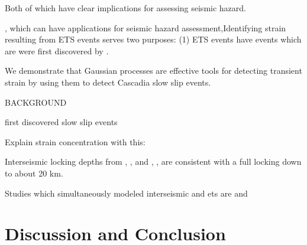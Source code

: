 \documentclass[10pt,a4paper]{article}
\begin{document}
Both of which have clear implications for assessing seismic hazard.

, which can have applications for seismic hazard assessment,Identifying strain resulting from ETS events serves two purposes: (1) ETS events have  events which are  were first discovered by \citet{Dragert2001}.   


We demonstrate that Gaussian processes are effective tools for detecting transient strain by using them to detect Cascadia slow slip events.  

BACKGROUND

\citet{Dragert2001} first discovered slow slip events

Explain strain concentration with this:

 
Interseismic locking depths from \citet{Fluck1997}, \citet{Murray2000}, \citet{McCaffrey2007} and \citet{McCaffrey2013}, \citet{Burgette2009}, \citet{schmalzle2014} are consistent with a full locking down to about 20 km.

Studies which simultaneously modeled interseismic and ets are \citet{Holtkamp2010} and \citet{schmalzle2014}


\section{Discussion and Conclusion}\label{sec:Discussion}







\end{document}
